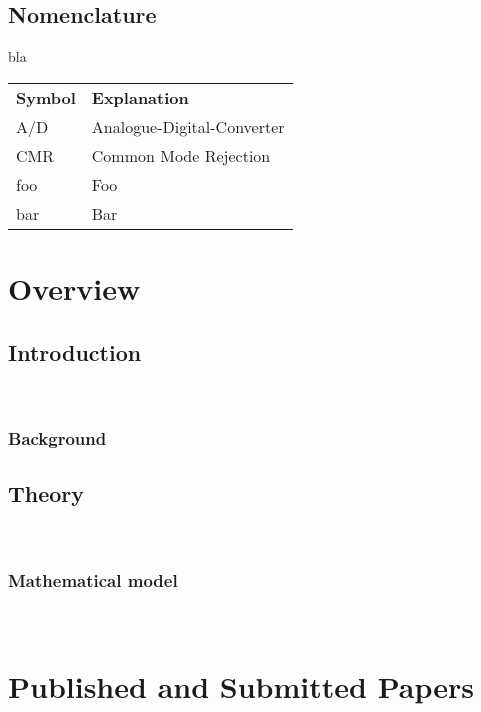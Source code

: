 \documentclass[11pt,openright]{book} %
\begin{document}
\chapter*{Nomenclature}
\label{sec:summary}
bla

\begin{longtable}{ll}
  \textbf{Symbol} & \textbf{Explanation}\endhead\\
  A/D	& Analogue-Digital-Converter \\
  CMR	& Common Mode Rejection \\
  foo	& Foo \\
  bar 	& Bar
\end{longtable}


\mainmatter
\part{Overview}  %
\label{part:overview}
\chapter{Introduction}
\label{intro}
\
\section{Background}
\label{sec:back}
\lipsum

\chapter{Theory}
\label{intro}
\
\section{Mathematical model}
\label{sec:back}
\lipsum


~\nocite{*}

\cleardoublepage
{}



\appendix
\renewcommand{\appendixname}{Paper} %

\part{Published and Submitted Papers}  %
\label{part:papers}
\end{document}
